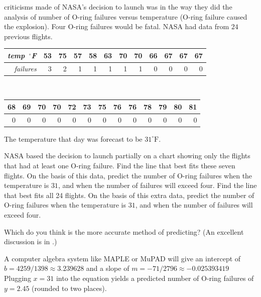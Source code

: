 \begin{exercises}
    criticisms made of NASA's decision to launch was in the way they did the
    analysis of number of O-ring failures versus temperature
    (O-ring failure caused the explosion).
    Four O-ring failures would be fatal.
    NASA had data from $24$ previous flights.
    \begin{center}
      \begin{tabular}{r|rrrrrrrrrrr}
         \textit{temp\ ${}^\circ$F} 
            &53 &75 &57 &58 &63 &70 &70 &66 &67 &67 &67 \\
         \hline
         \textit{failures}  
            &3  &2  &1  &1  &1  &1  &1  &0  &0  &0  &0
      \end{tabular}\hspace*{3em}                                           \\
      \hspace*{3em}\begin{tabular}{|rrrrrrrrrrrrr}
                68 &69 &70 &70 &72 &73 &75 &76 &76 &78 &79 &80 &81\\
         \hline
                0  &0  &0  &0  &0  &0  &0  &0  &0  &0  &0  &0  &0
      \end{tabular}
    \end{center}
    The temperature that day was forecast to be \( 31^\circ\text{F} \).
    \begin{exparts}
      \partsitem NASA based the decision to launch partially on a chart showing
        only the flights that had at least one O-ring failure.
        Find the line that best fits these seven flights.
        On the basis of this data,
        predict the number of O-ring failures when the temperature is $31$, and
        when the number of failures will exceed four.
      \partsitem Find the line that best fits all 24 flights.
        On the basis of this extra data,
        predict the number of O-ring failures when the temperature is $31$, and
        when the number of failures will exceed four.
    \end{exparts}
    Which do you think is the more accurate method of predicting?
    (An excellent discussion is in \cite{Stats}.)
    \begin{answer}
      \begin{exparts}
        \partsitem A computer algebra system like MAPLE or MuPAD will give
          an intercept of $b=4259/1398\approx 3.239628$
          and a slope of $m=-71/2796\approx -0.025393419$     
          Plugging $x=31$ into the equation yields a predicted number of
          O-ring failures of $y=2.45$ (rounded to two places).

\end{exparts}
\end{answer}
\end{exercises}
